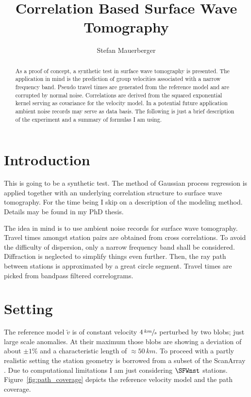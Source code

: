 \documentclass[11pt]{article}
\title{Correlation Based Surface Wave Tomography}
\author{Stefan Mauerberger}
\begin{document}
\maketitle
\begin{abstract}
    As a proof of concept, a synthetic test in surface wave tomography is presented.
    The application in mind is the prediction of group velocities associated with a narrow frequency band.
    Pseudo travel times are generated from the reference model and are corrupted by normal noise.
    Correlations are derived from the squared exponential kernel serving as covariance for the velocity model.
    In a potential future application ambient noise records may serve as data basis.
    The following is just a brief description of the experiment and a summary of formulas I am using.
\end{abstract}

\section{Introduction}


This is going to be a synthetic test.
The method of Gaussian process regression is applied together with an underlying correlation structure to surface wave tomography.
For the time being I skip on a description of the modeling method.
Details may be found in my PhD thesis.

The idea in mind is to use ambient noise records for surface wave tomography.
Travel times amongst station pairs are obtained from cross correlations.
To avoid the difficulty of dispersion, only a narrow frequency band shall be considered.
Diffraction is neglected to simplify things even further.
Then, the ray path between stations is approximated by a great circle segment.
Travel times are picked from bandpass filtered correlograms.


\section{Setting}

The reference model $\tilde v$ is of constant velocity $4\,\sfrac{km}s$ perturbed by two blobs; just large scale anomalies.
At their maximum those blobs are showing a deviation of about $\pm 1\%$ and a characteristic length of $\approx\!50\,km$.
To proceed with a partly realistic setting the station geometry is borrowed from a subset of the ScanArray \parencite{ScanArray2017}.
Due to computational limitations I am just considering $\SFWnst$ stations.
Figure~\ref{fig:path_coverage} depicts the reference velocity model and the path coverage.
\end{document}
